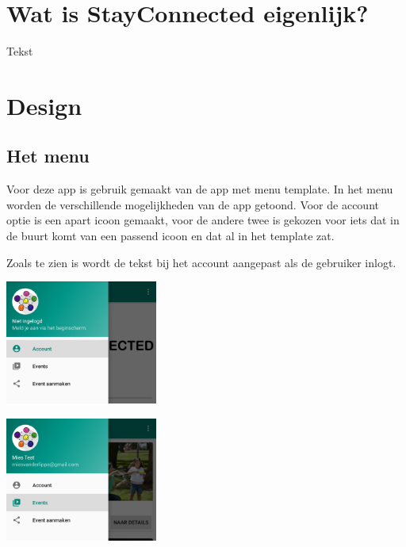 \documentclass[dutch]{report}
\begin{document}
	\section{Wat is StayConnected eigenlijk?}
	Tekst
	
	\newpage
	
	\section{Design}
	
	
	\subsection{Het menu}
	Voor deze app is gebruik gemaakt van de app met menu template. In het menu worden de verschillende 
	mogelijkheden van de app getoond. Voor de account optie is een apart icoon gemaakt, voor de andere
	twee is gekozen voor iets dat in de buurt komt van een passend icoon en dat al in het template zat. 
	
	Zoals te zien is wordt de tekst bij het account aangepast als de gebruiker inlogt. 
	
	\begin{minipage}{0.50\textwidth}
		\begin{center}
			\includegraphics[width=5cm]{images/nietingelogd.png}		
		\end{center}
	\end{minipage}
	\hfill
	\begin{minipage}{0.50\textwidth}
		\begin{center}
			\includegraphics[width=5cm]{images/ingelogd.png}
		\end{center}
	\end{minipage}
	
\end{document}
